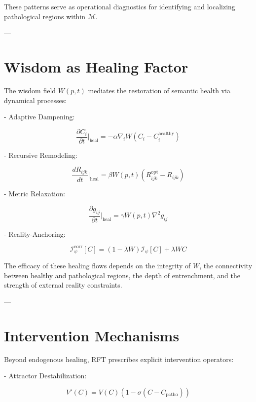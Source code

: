These patterns serve as operational diagnostics for identifying and localizing pathological regions within $\mathcal{M}$.

---

\section{Wisdom as Healing Factor}

The wisdom field $W(p,t)$ mediates the restoration of semantic health via dynamical processes:

- Adaptive Dampening:

\begin{equation}
\frac{\partial C_i}{\partial t}\bigg|_{\text{heal}} = -\alpha \nabla_i W (C_i - C_i^{\text{healthy}})
\end{equation}

- Recursive Remodeling:

\begin{equation}
\frac{dR_{ijk}}{dt}\bigg|_{\text{heal}} = \beta W(p,t) (R_{ijk}^{\text{opt}} - R_{ijk})
\end{equation}

- Metric Relaxation:

\begin{equation}
\frac{\partial g_{ij}}{\partial t}\bigg|_{\text{heal}} = \gamma W(p,t) \nabla^2 g_{ij}
\end{equation}

- Reality-Anchoring:

\begin{equation}
\mathcal{I}_{\psi}^{\text{corr}}[C] = (1-\lambda W)\mathcal{I}_{\psi}[C] + \lambda W C
\end{equation}

The efficacy of these healing flows depends on the integrity of $W$, the connectivity between healthy and pathological regions, the depth of entrenchment, and the strength of external reality constraints.

---

\section{Intervention Mechanisms}

Beyond endogenous healing, RFT prescribes explicit intervention operators:

- Attractor Destabilization:

\begin{equation}
V'(C) = V(C) (1 - \sigma(C - C_{\text{patho}}))
\end{equation}

